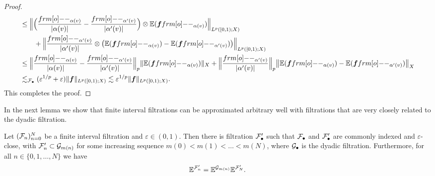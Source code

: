 \begin{proof}
\begin{equation*}
\begin{aligned}
    &\leq \Big\| \Big( \frac{\1_{\alpha(v)}}{|\alpha(v)|} - \frac{\1_{\alpha'(v)}}{|\alpha'(v)|}\Big) \otimes \E(\mb{f}\1_{\alpha(v)}) \Big\|_{L^p([0,1);X)} \\
    &\qquad + \Big\| \frac{\1_{\alpha'(v)}}{|\alpha'(v)|} \otimes \big( \E(\mb{f}\1_{\alpha(v)}) -  \E(\mb{f}\1_{\alpha'(v)}) \big)\Big\|_{L^p([0,1);X)}\\
    &\leq  \Big\| \frac{\1_{\alpha(v)}}{|\alpha(v)|} - \frac{\1_{\alpha'(v)}} {|\alpha'(v)|} \Big\|_{p} \| \E(\mb{f}\1_{\alpha(v)}) \|_{X}
    + \Big\| \frac{\1_{\alpha'(v)}}{|\alpha'(v)|} \Big\|_{p} \big\|  \E(\mb{f}\1_{\alpha(v)}) -  \E(\mb{f}\1_{\alpha'(v)}) \big\|_{X} \\
    &\lesssim_{\mc{F}_{\bullet}} (\varepsilon^{1/p} + \varepsilon) \|\mb{f}\|_{L^p([0,1);X)} \lesssim \varepsilon^{1/p} \|\mb{f}\|_{L^p([0,1);X)}.
  \end{aligned}
\end{equation*}
This completes the proof.
\end{proof}


In the next lemma we show that finite interval filtrations can be approximated arbitrary well with filtrations that are very closely related to the dyadic filtration.

\begin{lem}\label{lem:dyadic-approximation}
  Let $(\mathcal{F}_{n})_{n=0}^{N}$ be a finite interval filtration and $\varepsilon \in (0,1)$.
  Then there is filtration $\mathcal{F}'_{\bullet}$ such that $\mathcal{F}_{\bullet}$ and $\mathcal{F}'_{\bullet}$ are commonly indexed and $\varepsilon$-close, with $\mathcal{F}'_{n} \subset \mathcal{G}_{m(n)}$ for some increasing sequence $m(0) < m(1) < \ldots < m(N)$, where $\mathcal{G}_{\bullet}$ is the dyadic filtration.
  Furthermore, for all $n \in \{0,1,\ldots,N\}$ we have
  \begin{equation}\label{eq:approx-CE-ident}
    \mathbb{E}^{\mathcal{F}'_{n}} = \mathbb{E}^{\mathcal{G}_{m(n)}} \mathbb{E}^{\mathcal{F}'_{N}}.
  \end{equation}
\end{lem}

